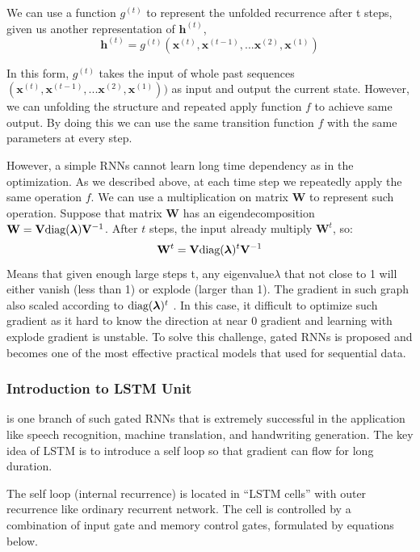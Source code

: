 \documentclass[11pt]{article}
\begin{document}
We can use a function \(g^{(t)}\) to represent the unfolded recurrence after t steps, given us another representation of \(\bm{h}^{(t)}\),
\[\bm{h}^{(t)} = g^{(t)}(\bm{x}^{(t)}, \bm{x}^{(t-1)}, ...\bm{x}^{(2)}, \bm{x}^{(1)})\]

In this form, \(g^(t)\) takes the input of whole past sequences \((\bm{x}^{(t)}, \bm{x}^{(t-1)}, ...\bm{x}^{(2)}, \bm{x}^{(1)}))\) as input and output the current state. However, we can unfolding the structure and repeated apply function \(f\) to achieve same output. By doing this we can use the same transition function \(f\) with the same parameters at every step.

However, a simple RNNs cannot learn long time dependency as in the optimization. As we described above, at each time step we repeatedly apply the same operation \(f\). We can use a multiplication on matrix \(\mathbf{W}\) to represent such operation. Suppose that matrix \(\mathbf{W}\) has an eigendecomposition \(\mathbf{W} = \mathbf{V}\textnormal{diag}(\bm{\lambda})\mathbf{V}^{-1}\). After $t$ steps, the input already multiply \(\mathbf{W}^{t}\), so:
\[\mathbf{W}^{t} = \mathbf{V}\textnormal{diag}(\bm{\lambda})^{t}\mathbf{V}^{-1}\]
Means that given enough large steps t, any eigenvalue\( \lambda\) that not close to 1 will either vanish (less than 1) or explode (larger than 1). The gradient in such graph also scaled according to \(\textnormal{diag}(\bm{\lambda})^{t}\) \cite{goodfellow2016deeplearning}. In this case, it difficult to optimize such gradient as it hard to know the direction at near 0 gradient and learning with explode gradient is unstable. To solve this challenge, gated RNNs is proposed and becomes one of the most effective practical models that used for sequential data.\\

\subsubsection{Introduction to LSTM Unit} \cite{hochreiter1997lstm} is one branch of such gated RNNs that is extremely successful in the application like speech recognition, machine translation, and handwriting generation. The key idea of LSTM is to introduce a self loop so that gradient can flow for long duration. 

The self loop (internal recurrence) is located in ``LSTM cells'' with outer recurrence like ordinary recurrent network. The cell is controlled by a combination of input gate and memory control gates, formulated by equations below.
\end{document}
